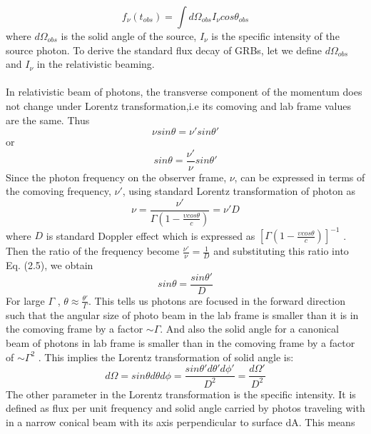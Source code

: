 \begin{equation}
 f_{\nu}(t_{obs})= \int d\Omega_{obs} I_{\nu}cos\theta_{obs}
 \end{equation}
 where  $ d\Omega_{obs}$ is the solid angle of the source, $ I_{\nu} $  is the specific intensity of the source photon. To derive the standard flux decay of GRBs, let we define $ d\Omega_{obs}$   and $ I_{\nu} $ in the relativistic beaming.\\\\ In relativistic beam of photons, the transverse component of the momentum does not change under Lorentz transformation,i.e its comoving and lab frame values are the same. Thus
\begin{equation}
\nu sin\theta = \nu'sin\theta'
\end{equation}
or
\begin{equation}
sin\theta =\frac{\nu'}{\nu}sin \theta'
\end{equation}
Since the photon frequency on the observer frame, $ \nu $, can be expressed in terms of the comoving frequency, $ \nu' $, using standard Lorentz transformation of photon as
\begin{equation}
\nu =\frac{\nu'}{\Gamma (1 -\frac{\upsilon cos\theta}{c})} =\nu'D
\end{equation}
where $ D $ is standard Doppler effect which is expressed as $ [\Gamma (1 -\frac{\upsilon cos\theta}{c} )]^{-1}$ . Then the ratio of the frequency become $ \frac{\nu'}{\nu} = \frac{1}{D}$ and substituting this ratio into Eq. (2.5), we obtain
\begin{equation}
sin\theta = \frac{sin\theta'}{D}
\end{equation}
For large $\Gamma$ , $\theta  \approx \frac{\theta'}{\Gamma}$. This tells us photons are focused in the forward direction such that the angular size of photo beam in the lab frame is smaller than it is in the comoving frame by a factor $\sim \Gamma $. And also the solid angle for a canonical beam of photons in lab frame is smaller than in the comoving frame by a factor of $\sim \Gamma^{2}$ . This implies the Lorentz transformation of solid angle is:
\begin{equation}
d\Omega =sin\theta d\theta d\phi =\frac{sin\theta'd\theta'd\phi'}{D^{2}}= \frac{d\Omega'}{D^{2}}
\end{equation}
The other parameter in the Lorentz transformation is the specific intensity. It is
defined as flux per unit frequency and solid angle carried by photos traveling with in a narrow conical beam with its axis perpendicular to surface dA. This means

